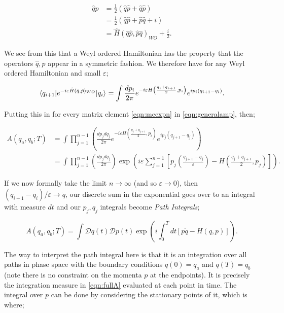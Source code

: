 \begin{equation}
\begin{split}
\hat{q} \hat{p} &= \frac{1}{2}( \hat{q} \hat{p} + \hat{q} \hat{p}) \\
&= \frac{1}{2}(\hat{q} \hat{p} + \hat{p} \hat{q} + i) \\
&= \hat{H}(\hat{q} \hat{p}, \hat{p} \hat{q})_{WO} + \frac{i}{2}. 
\end{split}
\end{equation}

We see from this that a Weyl ordered Hamiltonian has the property that the operators $\hat{q}, \hat{p}$ appear in a symmetric fashion. We therefore have for any Weyl ordered Hamiltonian and small $\varepsilon$;

\begin{equation}
\mathinner{\langle q_{i+1}\vert e^{-i \varepsilon \hat{H}(\hat{q}, \hat{p})_{WO}}\vert q_i\rangle}_{} = \int \frac{d p_i}{2 \pi} e^{- i \varepsilon H\left(\frac{q_i + q_{i+1}}{2}, p_i\right)}e^{i p_i(q_{i+1} - q_i)}.
\end{equation}

Putting this in for every matrix element \ref{eqn:meexpn} in \ref{eqn:generalamp}, then;

\begin{equation}
\label{eqn:fullA}
\begin{split}
A(q_a,q_b;T) &= \int \prod_{j=1}^{n-1} \left(\frac{dp_j dq_j}{2 \pi} e^{- i \varepsilon H\left(\frac{q_j + q_{j+1}}{2}, p_i\right)}e^{i p_j(q_{j+1} - q_j)}\right) \\
&= \int \prod_{j=1}^{n-1} \left(\frac{dp_j dq_j}{2 \pi} \right) \exp \left(i \varepsilon \sum_{j=1}^{n-1} \left[ p_j \left(\frac{q_{j+1}-q_j}{\varepsilon}\right) - H \left( \frac{q_j + q_{j+1}}{2}, p_j \right) \right] \right).
\end{split}
\end{equation}

If we now formally take the limit $n \to \infty $ (and so $\varepsilon \to 0$), then $(q_{i+1}-q_i)/\varepsilon \to \dot{q}$, our discrete sum in the exponential goes over to an integral with measure $dt$ and our $p_j, q_j$ integrals become \emph{Path Integrals};

\begin{equation}
A(q_a, q_b; T) = \int \mathcal{D}q(t) \mathcal{D}p(t) \exp \left(i \int_0^T dt [p \dot{q} - H(q,p)] \right).
\end{equation}

The way to interpret the path integral here is that it is an integration over all paths in phase space with the boundary conditions $q(0) = q_a$ and $q(T) = q_b$ (note there is no constraint on the momenta $p$ at the endpoints). It is precisely the integration measure in \ref{eqn:fullA} evaluated at each point in time. The integral over $p$ can be done by considering the stationary points of it, which is where;

